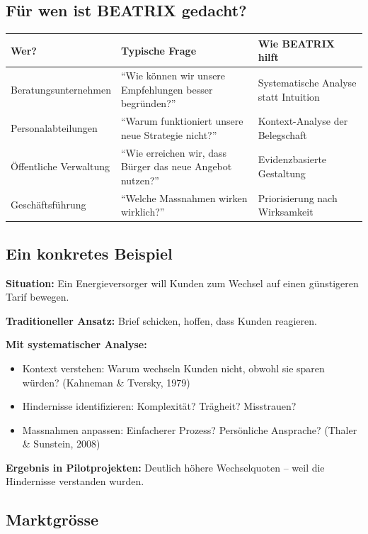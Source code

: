 \documentclass[11pt,a4paper]{article}
\begin{document}
\subsection{Für wen ist BEATRIX gedacht?}

\begin{table}[h]
\centering
\begin{tabular}{@{}L{3.5cm}L{4.5cm}L{5cm}@{}}
\toprule
\textbf{Wer?} & \textbf{Typische Frage} & \textbf{Wie BEATRIX hilft} \\
\midrule
Beratungsunternehmen & ``Wie können wir unsere Empfehlungen besser begründen?'' & Systematische Analyse statt Intuition \\
Personalabteilungen & ``Warum funktioniert unsere neue Strategie nicht?'' & Kontext-Analyse der Belegschaft \\
Öffentliche Verwaltung & ``Wie erreichen wir, dass Bürger das neue Angebot nutzen?'' & Evidenzbasierte Gestaltung \\
Geschäftsführung & ``Welche Massnahmen wirken wirklich?'' & Priorisierung nach Wirksamkeit \\
\bottomrule
\end{tabular}
\end{table}

\subsection{Ein konkretes Beispiel}

\textbf{Situation:} Ein Energieversorger will Kunden zum Wechsel auf einen günstigeren Tarif bewegen.

\textbf{Traditioneller Ansatz:} Brief schicken, hoffen, dass Kunden reagieren.

\textbf{Mit systematischer Analyse:}
\begin{itemize}
    \item Kontext verstehen: Warum wechseln Kunden nicht, obwohl sie sparen würden? (Kahneman \& Tversky, 1979)
    \item Hindernisse identifizieren: Komplexität? Trägheit? Misstrauen?
    \item Massnahmen anpassen: Einfacherer Prozess? Persönliche Ansprache? (Thaler \& Sunstein, 2008)
\end{itemize}

\textbf{Ergebnis in Pilotprojekten:} Deutlich höhere Wechselquoten -- weil die Hindernisse verstanden wurden.

\subsection{Marktgrösse}
\end{document}
